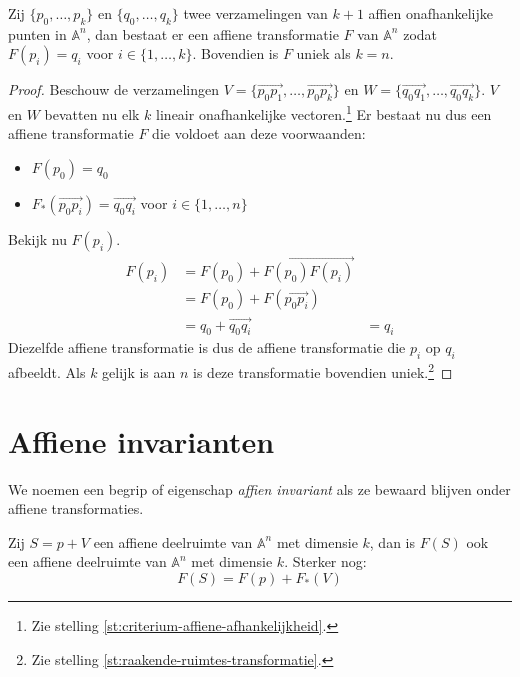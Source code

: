 \documentclass[main.tex]{subfiles}
\begin{document}
\begin{gev}
  Zij $\{p_{0},\dotsc,p_{k}\}$ en $\{q_{0},\dotsc,q_{k}\}$ twee verzamelingen van $k+1$ affien onafhankelijke punten in $\mathbb{A}^{n}$, dan bestaat er een affiene transformatie $F$ van $\mathbb{A}^{n}$ zodat $F(p_{i}) = q_{i}$ voor $i \in \{ 1,\dotsc,k \}$. Bovendien is $F$ uniek als $k=n$.

  \begin{proof}
    Beschouw de verzamelingen $V = \{\overrightarrow{p_{0}p_{1}},\dotsc,\overrightarrow{p_{0}p_{k}}\}$ en $W = \{\overrightarrow{q_{0}q_{1}},\dotsc,\overrightarrow{q_{0}q_{k}}\}$.
    $V$ en $W$ bevatten nu elk $k$ lineair onafhankelijke vectoren.\footnote{Zie stelling \ref{st:criterium-affiene-afhankelijkheid}.}
    Er bestaat nu dus een affiene transformatie $F$ die voldoet aan deze voorwaanden:
    \begin{itemize}
    \item $F(p_{0}) = q_{0}$
    \item $F_{*}(\overrightarrow{p_{0}p_{i}}) = \overrightarrow{q_{0}q_{i}}$ voor $i \in \{ 1,\dotsc,n \}$
    \end{itemize}
    Bekijk nu $F(p_{i})$.
    \[
    \begin{array}{rll}
      F(p_{i}) &= F(p_{0}) + \overrightarrow{F(p_{0})F(p_{i})} &\\
               &= F(p_{0}) + F(\overrightarrow{p_{0}p_{i}}) &\\
               &= q_{0} + \overrightarrow{q_{0}q_{i}} &= q_{i}
    \end{array} 
    \]
    Diezelfde affiene transformatie is dus de affiene transformatie die $p_{i}$ op $q_{i}$ afbeeldt.
    Als $k$ gelijk is aan $n$ is deze transformatie bovendien uniek.\footnote{Zie stelling \ref{st:raakende-ruimtes-transformatie}.}
   \end{proof}
\end{gev}


\section{Affiene invarianten}
\label{sec:affiene-invarianten}

\begin{de}
  We noemen een begrip of eigenschap \emph{affien invariant} als ze bewaard blijven onder affiene transformaties.
\end{de}

\begin{st}
  Zij $S = p+V$ een affiene deelruimte van $\mathbb{A}^{n}$ met dimensie $k$, dan is $F(S)$ ook een affiene deelruimte van $\mathbb{A}^{n}$ met dimensie $k$.
  Sterker nog:
  \[ F(S) = F(p) + F_{*}(V) \]

\end{st}
\end{document}
